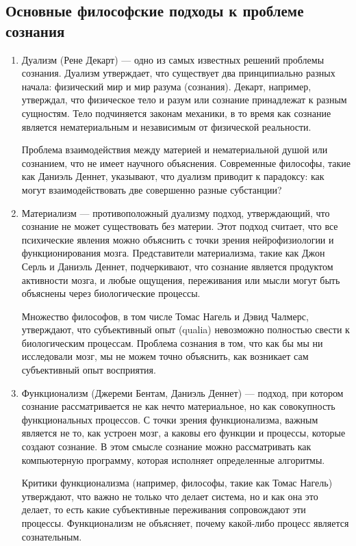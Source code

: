 \documentclass[12pt,a4paper]{article}
\begin{document}
	\subsection{Основные философские подходы к проблеме сознания}
	\begin{enumerate}
		\item Дуализм (Рене Декарт) — одно из самых известных решений проблемы сознания. Дуализм утверждает, что существует два принципиально разных начала: физический мир и мир разума (сознания). Декарт, например, утверждал, что физическое тело и разум или сознание принадлежат к разным сущностям. Тело подчиняется законам механики, в то время как сознание является нематериальным и независимым от физической реальности.
		
		
		Проблема взаимодействия между материей и нематериальной душой или сознанием, что не имеет научного объяснения.
		Современные философы, такие как Даниэль Деннет, указывают, что дуализм приводит к парадоксу: как могут взаимодействовать две совершенно разные субстанции?
		
		
		\item Материализм — противоположный дуализму подход, утверждающий, что сознание не может существовать без материи. Этот подход считает, что все психические явления можно объяснить с точки зрения нейрофизиологии и функционирования мозга. Представители материализма, такие как Джон Серль и Даниэль Деннет, подчеркивают, что сознание является продуктом активности мозга, и любые ощущения, переживания или мысли могут быть объяснены через биологические процессы.
		
		
		Множество философов, в том числе Томас Нагель и Дэвид Чалмерс, утверждают, что субъективный опыт (qualia) невозможно полностью свести к биологическим процессам. Проблема сознания в том, что как бы мы ни исследовали мозг, мы не можем точно объяснить, как возникает сам субъективный опыт восприятия.
		
		\item Функционализм (Джереми Бентам, Даниэль Деннет) — подход, при котором сознание рассматривается не как нечто материальное, но как совокупность функциональных процессов. С точки зрения функционализма, важным является не то, как устроен мозг, а каковы его функции и процессы, которые создают сознание. В этом смысле сознание можно рассматривать как компьютерную программу, которая исполняет определенные алгоритмы.
		
		
		Критики функционализма (например, философы, такие как Томас Нагель) утверждают, что важно не только что делает система, но и как она это делает, то есть какие субъективные переживания сопровождают эти процессы. Функционализм не объясняет, почему какой-либо процесс является сознательным.
		

\end{enumerate}
\end{document}
